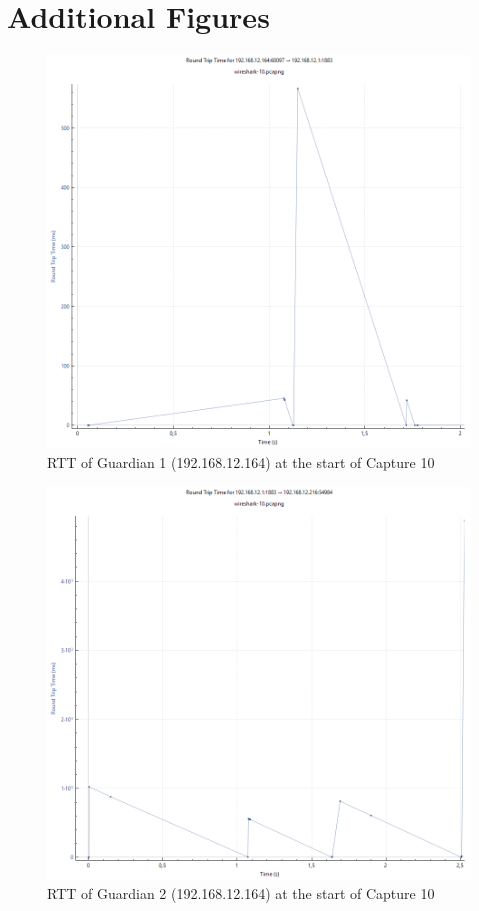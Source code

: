 \section{Additional Figures} 
\begin{figure}[h!]
    \centering
    \includegraphics[width=\textwidth]{abbildungen/wireshark/10-g1.png}
    \caption{\ac{RTT} of Guardian 1 (192.168.12.164) at the start of Capture 10}
    \label{fig:rtt-g1-10}
\end{figure}
\begin{figure}[h!]
    \centering
    \includegraphics[width=\textwidth]{abbildungen/wireshark/10-g2.png}
    \caption{\ac{RTT} of Guardian 2 (192.168.12.164) at the start of Capture 10}
    \label{fig:rtt-g2-10}
\end{figure}
